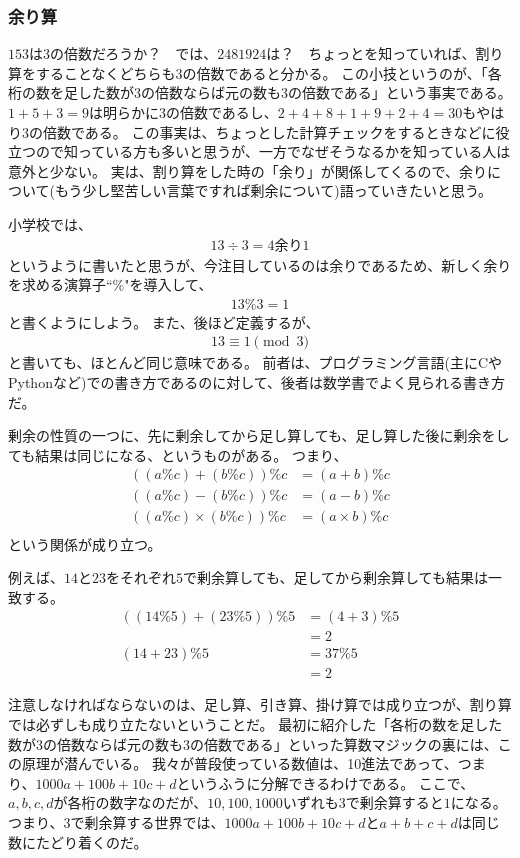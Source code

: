 \subsubsection{余り算}
$153$は$3$の倍数だろうか？　では、$2481924$は？　ちょっとを知っていれば、割り算をすることなくどちらも$3$の倍数であると分かる。
この小技というのが、「各桁の数を足した数が$3$の倍数ならば元の数も$3$の倍数である」という事実である。
$1+5+3=9$は明らかに$3$の倍数であるし、$2+4+8+1+9+2+4=30$もやはり$3$の倍数である。
この事実は、ちょっとした計算チェックをするときなどに役立つので知っている方も多いと思うが、一方でなぜそうなるかを知っている人は意外と少ない。
実は、割り算をした時の「余り」が関係してくるので、余りについて(もう少し堅苦しい言葉ですれば剰余について)語っていきたいと思う。

小学校では、
\begin{align*}
13 \div 3 = 4 \mbox{余り} 1
\end{align*}
というように書いたと思うが、今注目しているのは余りであるため、新しく余りを求める演算子``$\%$"を導入して、
\begin{align*}
13 \% 3 = 1
\end{align*}
と書くようにしよう。
また、後ほど定義するが、
\begin{align*}
13 \equiv 1 \pmod{3}
\end{align*}
と書いても、ほとんど同じ意味である。
前者は、プログラミング言語(主にCやPythonなど)での書き方であるのに対して、後者は数学書でよく見られる書き方だ。

剰余の性質の一つに、先に剰余してから足し算しても、足し算した後に剰余をしても結果は同じになる、というものがある。
つまり、
\begin{align*}
((a \% c) + (b \% c)) \% c &= (a + b) \% c\\
((a \% c) - (b \% c)) \% c &= (a - b) \% c\\
((a \% c) \times (b \% c)) \% c &= (a \times b) \% c\\
\end{align*}
という関係が成り立つ。

例えば、$14$と$23$をそれぞれ$5$で剰余算しても、足してから剰余算しても結果は一致する。
\begin{align*}
((14 \% 5) + (23 \% 5)) \% 5 &= (4 + 3) \% 5\\
&= 2\\
(14 + 23) \% 5 &= 37 \% 5\\
&= 2
\end{align*}

注意しなければならないのは、足し算、引き算、掛け算では成り立つが、割り算では必ずしも成り立たないということだ。
最初に紹介した「各桁の数を足した数が$3$の倍数ならば元の数も$3$の倍数である」といった算数マジックの裏には、この原理が潜んでいる。
我々が普段使っている数値は、10進法であって、つまり、$1000a + 100b + 10c + d$というふうに分解できるわけである。
ここで、$a,b,c,d$が各桁の数字なのだが、$10, 100, 1000$いずれも$3$で剰余算すると$1$になる。
つまり、$3$で剰余算する世界では、$1000a + 100b + 10c + d$と$a + b + c + d$は同じ数にたどり着くのだ。

